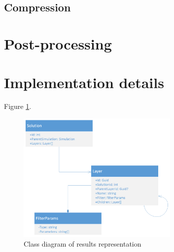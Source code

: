 \subsection {Compression}

\section{Post-processing}
\label{sec:postprocessing}


\section{Implementation details}
\label{sec:implementation-details}



Figure \ref{fig:results-class-diagram}.

\begin{figure}[H]
    \centering
    \includegraphics[width=0.7\textwidth]{figures/results-class-diagram}
    \decoRule
    \caption{Class diagram of results representation}
    \label{fig:results-class-diagram}
\end{figure}
